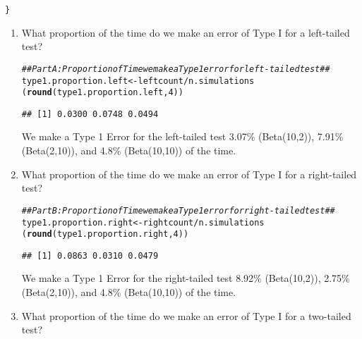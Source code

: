 \documentclass{article}\usepackage[]{graphicx}\usepackage[]{xcolor}
\makeatletter
\newcommand{\hlnum}[1]{\textcolor[rgb]{0.686,0.059,0.569}{#1}}%
\newcommand{\hlcom}[1]{\textcolor[rgb]{0.678,0.584,0.686}{\textit{#1}}}%
\newcommand{\hlopt}[1]{\textcolor[rgb]{0,0,0}{#1}}%
\newcommand{\hldef}[1]{\textcolor[rgb]{0.345,0.345,0.345}{#1}}%
\newcommand{\hlkwb}[1]{\textcolor[rgb]{0.69,0.353,0.396}{#1}}%
\newcommand{\hlkwd}[1]{\textcolor[rgb]{0.737,0.353,0.396}{\textbf{#1}}}%
\newenvironment{kframe}{%
 \def\at@end@of@kframe{}%
 \ifinner\ifhmode%
  \def\at@end@of@kframe{\end{minipage}}%
  \begin{minipage}{\columnwidth}%
 \fi\fi%
 \def\FrameCommand##1{\hskip\@totalleftmargin \hskip-\fboxsep
 \colorbox{shadecolor}{##1}\hskip-\fboxsep
     \hskip-\linewidth \hskip-\@totalleftmargin \hskip\columnwidth}%
 \MakeFramed {\advance\hsize-\width
   \@totalleftmargin\z@ \linewidth\hsize
   \@setminipage}}%
 {\par\unskip\endMakeFramed%
 \at@end@of@kframe}
\newenvironment{knitrout}{}{} %
\makeatother
\begin{document}
\begin{enumerate}
\begin{knitrout}
\begin{kframe}
\begin{alltt}
\hldef{\}}
\end{alltt}
\end{kframe}
\end{knitrout}
  \begin{enumerate}
    \item What proportion of the time do we make an error of Type I for a
    left-tailed test?
\begin{knitrout}
\color{fgcolor}\begin{kframe}
\begin{alltt}
\hlcom{## Part A: Proportion of Time we make a Type 1 error for left-tailed test ##}
\hldef{type1.proportion.left} \hlkwb{<-} \hldef{leftcount}\hlopt{/}\hldef{n.simulations}
\hldef{(}\hlkwd{round}\hldef{(type1.proportion.left,} \hlnum{4}\hldef{))}
\end{alltt}
\begin{verbatim}
## [1] 0.0300 0.0748 0.0494
\end{verbatim}
\end{kframe}
\end{knitrout}
We make a Type 1 Error for the left-tailed test 3.07\% (Beta(10,2)), 7.91\% (Beta(2,10)), and 4.8\% (Beta(10,10)) of the time.
    \item What proportion of the time do we make an error of Type I for a
    right-tailed test?
\begin{knitrout}
\color{fgcolor}\begin{kframe}
\begin{alltt}
\hlcom{## Part B: Proportion of Time we make a Type 1 error for right-tailed test ##}
\hldef{type1.proportion.right} \hlkwb{<-} \hldef{rightcount}\hlopt{/}\hldef{n.simulations}
\hldef{(}\hlkwd{round}\hldef{(type1.proportion.right,} \hlnum{4}\hldef{))}
\end{alltt}
\begin{verbatim}
## [1] 0.0863 0.0310 0.0479
\end{verbatim}
\end{kframe}
\end{knitrout}
We make a Type 1 Error for the right-tailed test 8.92\% (Beta(10,2)), 2.75\% (Beta(2,10)), and 4.8\% (Beta(10,10)) of the time.
    \item What proportion of the time do we make an error of Type I for a
    two-tailed test?
\begin{knitrout}
\color{fgcolor}\begin{kframe}

\end{kframe}
\end{knitrout}
\end{enumerate}
\end{enumerate}
\end{document}
